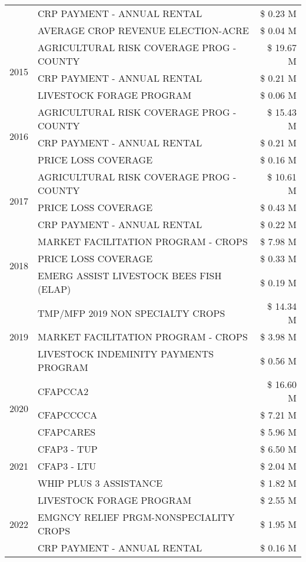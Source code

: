\begin{tabular}{llr}
 & CRP PAYMENT - ANNUAL RENTAL & \$ 0.23 M \\
 & AVERAGE CROP REVENUE ELECTION-ACRE & \$ 0.04 M \\
\cline{1-3}
\multirow[t]{3}{*}{2015} & AGRICULTURAL RISK COVERAGE PROG - COUNTY & \$ 19.67 M \\
 & CRP PAYMENT - ANNUAL RENTAL & \$ 0.21 M \\
 & LIVESTOCK FORAGE PROGRAM & \$ 0.06 M \\
\cline{1-3}
\multirow[t]{3}{*}{2016} & AGRICULTURAL RISK COVERAGE PROG - COUNTY & \$ 15.43 M \\
 & CRP PAYMENT - ANNUAL RENTAL & \$ 0.21 M \\
 & PRICE LOSS COVERAGE & \$ 0.16 M \\
\cline{1-3}
\multirow[t]{3}{*}{2017} & AGRICULTURAL RISK COVERAGE PROG - COUNTY & \$ 10.61 M \\
 & PRICE LOSS COVERAGE & \$ 0.43 M \\
 & CRP PAYMENT - ANNUAL RENTAL & \$ 0.22 M \\
\cline{1-3}
\multirow[t]{3}{*}{2018} & MARKET FACILITATION PROGRAM - CROPS & \$ 7.98 M \\
 & PRICE LOSS COVERAGE & \$ 0.33 M \\
 & EMERG ASSIST LIVESTOCK BEES FISH (ELAP) & \$ 0.19 M \\
\cline{1-3}
\multirow[t]{3}{*}{2019} & TMP/MFP 2019 NON SPECIALTY CROPS & \$ 14.34 M \\
 & MARKET FACILITATION PROGRAM - CROPS & \$ 3.98 M \\
 & LIVESTOCK INDEMINITY PAYMENTS PROGRAM & \$ 0.56 M \\
\cline{1-3}
\multirow[t]{3}{*}{2020} & CFAPCCA2 & \$ 16.60 M \\
 & CFAPCCCCA & \$ 7.21 M \\
 & CFAPCARES & \$ 5.96 M \\
\cline{1-3}
\multirow[t]{3}{*}{2021} & CFAP3 - TUP & \$ 6.50 M \\
 & CFAP3 - LTU & \$ 2.04 M \\
 & WHIP PLUS 3 ASSISTANCE & \$ 1.82 M \\
\cline{1-3}
\multirow[t]{3}{*}{2022} & LIVESTOCK FORAGE PROGRAM & \$ 2.55 M \\
 & EMGNCY RELIEF PRGM-NONSPECIALITY CROPS & \$ 1.95 M \\
 & CRP PAYMENT - ANNUAL RENTAL & \$ 0.16 M \\
\cline{1-3}
\bottomrule
\end{tabular}
